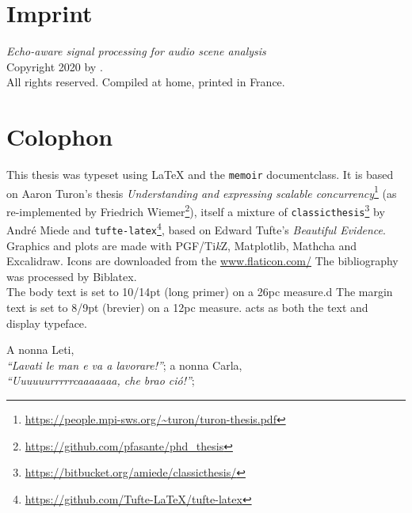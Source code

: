 \thispagestyle{empty}
\vspace*{11cm}
\section*{Imprint}

\textit{Echo-aware signal processing for audio scene analysis}\\
Copyright \textcopyright{} 2020 by \theauthor{}.\\
All rights reserved. Compiled at home, printed in France.\\

\section*{Colophon}
This thesis was typeset using \LaTeX{} and the \texttt{memoir} documentclass.
It is based on Aaron Turon's thesis \emph{Understanding and expressing scalable concurrency}\footnote{\url{https://people.mpi-sws.org/~turon/turon-thesis.pdf}}
(as re-implemented by Friedrich Wiemer\footnote{\url{https://github.com/pfasante/phd_thesis}}),
itself a mixture of \texttt{classicthesis}\footnote{\url{https://bitbucket.org/amiede/classicthesis/}} by Andr\'e Miede and \texttt{tufte-latex}\footnote{\url{https://github.com/Tufte-LaTeX/tufte-latex}},
based on Edward Tufte's \emph{Beautiful Evidence}.\\[0.5\baselineskip]

Graphics and plots are made with PGF/Ti\emph{k}Z, Matplotlib, Mathcha and Excalidraw.
Icons are downloaded from the \url{www.flaticon.com/}
The bibliography was processed by Biblatex.\\[0.5\baselineskip]

The body text is set to 10/14pt (long primer) on a 26pc measure.d
The margin text is set to 8/9pt (brevier) on a 12pc measure.
 acts as both the text and display typeface.

\thispagestyle{empty}
\vphantom{.}
\vfill
\begin{dedication}
	A nonna Leti,\\
	\textit{``Lavati le man e va a lavorare!''};
	\vfill
	a nonna Carla,\\
	\textit{``Uuuuuurrrrrcaaaaaaa, che brao ció!''};
\end{dedication}


